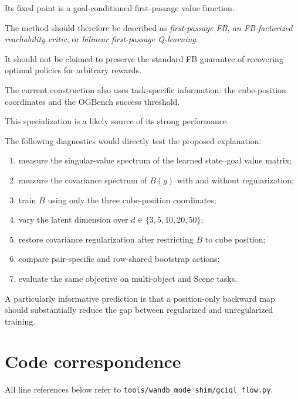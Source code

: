 \documentclass[11pt]{article}
\theoremstyle{remark}
\begin{document}
Its fixed point is a goal-conditioned first-passage value function.

The method should therefore be described as \emph{first-passage FB}, \emph{an FB-factorized reachability critic}, or \emph{bilinear first-passage Q-learning}.

It should not be claimed to preserve the standard FB guarantee of recovering optimal policies for arbitrary rewards.

The current construction also uses task-specific information: the cube-position coordinates and the OGBench success threshold.

This specialization is a likely source of its strong performance.

The following diagnostics would directly test the proposed explanation:

\begin{enumerate}[leftmargin=1.5em]
\item measure the singular-value spectrum of the learned state--goal value matrix;
\item measure the covariance spectrum of $B(g)$ with and without regularization;
\item train $B$ using only the three cube-position coordinates;
\item vary the latent dimension over $d\in\{3,5,10,20,50\}$;
\item restore covariance regularization after restricting $B$ to cube position;
\item compare pair-specific and row-shared bootstrap actions;
\item evaluate the same objective on multi-object and Scene tasks.
\end{enumerate}

A particularly informative prediction is that a position-only backward map should substantially reduce the gap between regularized and unregularized training.

\section{Code correspondence}

All line references below refer to \texttt{tools/wandb\_mode\_shim/gciql\_flow.py}.
\end{document}
